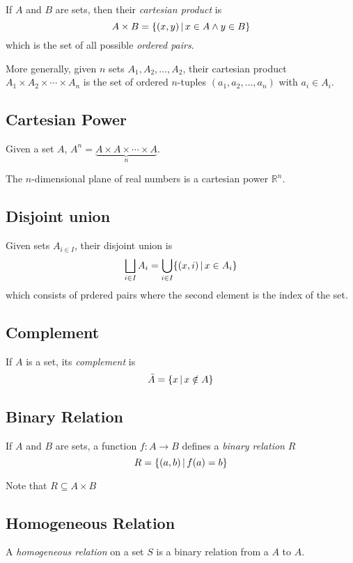 \documentclass[a4paper]{article}
\begin{document}
If \(A\) and \(B\) are sets, then their \textit{cartesian product} is
\[
    A\times B = \{(x,y) \,|\, x \in A \land y \in B\}
\]
which is the set of all possible \textit{ordered pairs}.

More generally, given \(n\) sets \(A_1, A_2, \ldots, A_2\),
their cartesian product \(A_1 \times A_2 \times \cdots \times A_n\)
is the set of ordered \(n\)-tuples \((a_1, a_2, \ldots, a_n)\) with \(a_i\in A_i\).

\subsection{Cartesian Power}

Given a set \(A\), \(A^n=\underbrace{A\times A\times \cdots \times A}_n\).

The \(n\)-dimensional plane of real numbers is a cartesian power \({\mathbb{R}}^n\).

\subsection{Disjoint union}

Given sets \(A_{i\in I}\), their disjoint union is
\[
    \bigsqcup_{i\in I}A_i= \bigcup_{i\in I}\{(x, i) \,|\, x \in A_i\}
\]
which consists of prdered pairs where the second element
is the index of the set.

\subsection{Complement}

If \(A\) is a set, its \textit{complement} is
\[
    \bar{A} = \{x \,|\, x \notin A\}
\]

\subsection{Binary Relation}

If \(A\) and \(B\) are sets, a function \(f:A\to B\)
defines a \textit{binary relation} \(R\)
\[
    R = \{(a,b) \,|\, f(a)=b\}
\]

Note that \(R\subseteq A\times B\)


\subsection{Homogeneous Relation}

A \textit{homogeneous relation} on a set \(S\) is a binary relation
from a \(A\) to \(A\).
\end{document}
